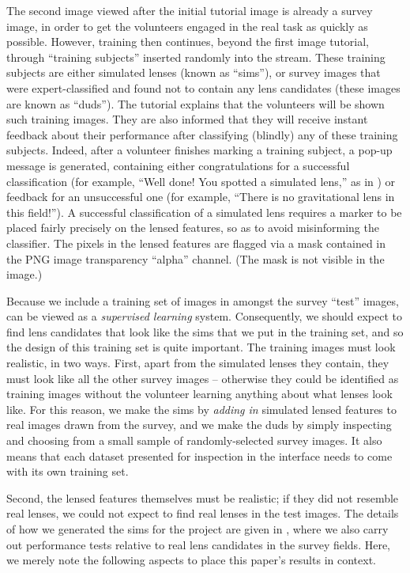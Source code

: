 \documentclass[useAMS,usenatbib,a4paper]{mn2e}
\begin{document}
The second image viewed after the initial tutorial image is already a survey
image, in order to get the volunteers engaged in the real task as quickly as
possible. However, training then continues, beyond the first image tutorial,
through ``training subjects'' inserted randomly into the stream.  These
training subjects are either simulated lenses (known as ``sims''), or survey
images that were expert-classified and found not to contain any lens
candidates (these images are known as ``duds''). The tutorial explains that
the volunteers  will be shown such training images. They are also informed
that they will receive instant feedback about their performance after
classifying (blindly) any of these training subjects. Indeed, after a volunteer
finishes marking a training subject, a pop-up
message is generated, containing either congratulations for a successful
classification (for example, ``Well done! You spotted a simulated lens,'' as
in ) or feedback for an unsuccessful one (for
example, ``There is no gravitational lens in this field!''). A successful
classification of a simulated lens requires a marker to be placed fairly
precisely on the lensed features, so as to avoid misinforming the classifier.
The pixels in the lensed features are flagged via a mask contained in the
PNG image transparency ``alpha'' channel. (The mask is not visible in the image.)

Because we include a training set of images in amongst the survey ``test''
images, \sw can be viewed as a {\it supervised learning} system. Consequently,
we should expect to find lens candidates that look like the sims that we put in
the training set, and so the design of this training set is quite important. The
training images must look realistic, in two ways. First, apart from the
simulated lenses they contain, they must look like all the other survey images --
otherwise they could be identified as training images without the volunteer
learning anything about what lenses look like. For this reason, we make the sims
by {\it adding in} simulated lensed features to real images drawn from the
survey, and we make the duds by simply inspecting and choosing from a small
sample of randomly-selected survey images. It also means that each dataset
presented for inspection in the \sw interface needs to come with its own
training set.

Second, the lensed features themselves must be realistic; if they did not
resemble real lenses, we could not expect to find real lenses in the test
images. The details of how we generated the sims for the \cfhtls project are
given in \PaperTwo, where we also carry out performance tests relative to real
lens candidates in the survey fields. Here, we merely note the following
aspects to place this paper's results in context.
\end{document}
